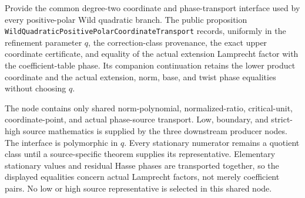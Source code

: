 \begin{theorem}
\label{mod:cases-wildquadratic-coordinatetransport}
Provide the common degree-two coordinate and phase-transport interface used
by every positive-polar Wild quadratic branch.  The public proposition
\texttt{WildQuadraticPositivePolarCoordinateTransport} records, uniformly in
the refinement parameter \(q\), the correction-class provenance, the exact
upper coordinate certificate, and equality of the actual extension
Lamprecht factor with the coefficient-table phase.  Its companion
continuation retains the lower product coordinate and the actual
extension, norm, base, and twist phase equalities without choosing \(q\).

The node contains only shared norm-polynomial, normalized-ratio, critical-unit,
coordinate-point, and actual phase-source transport.  Low, boundary, and
strict-high source mathematics is supplied by the three downstream producer
nodes.
\leanok
{}
\FormalizationContract
The interface is polymorphic in \(q\).  Every stationary numerator remains a
quotient class until a source-specific theorem supplies its representative.
Elementary stationary values and residual Hasse phases are transported
together, so the displayed equalities concern actual Lamprecht factors, not
merely coefficient pairs.  No low or high source representative is selected
in this shared node.
\end{theorem}

